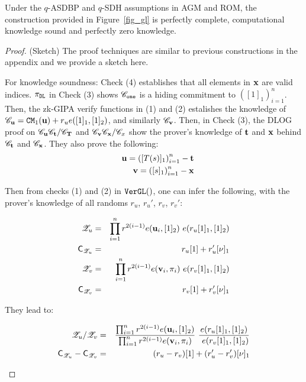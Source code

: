 \begin{lemma}\label{lemma_gl} Under the $q$-ASDBP and 
$q$-SDH assumptions \cite{Bunz21} in AGM and ROM, the construction provided in 
Figure\ \ref{fig_gl} is perfectly complete, computational knowledge
sound and perfectly zero knowledge.
\end{lemma}

\begin{proof} (Sketch) The proof techniques are similar to previous
constructions in the appendix and we provide a sketch here. 

For knowledge soundness: Check (4) establishes that all elements in
${{\mathbf {x}}}$ are valid indices. $\pi_{{\tt DL}}$ in Check (3) shows 
${\mathscr{C}}_{{\tt one}}$ is a hiding commitment to $([1]_1)_{i=1}^n$. 
Then, the zk-GIPA verify functions
in (1) and (2) estalishes the knowledge of 
${\mathscr{C}}_{{{\mathbf {u}}}} = {\mathtt{CM}}_1({{\mathbf {u}}}) + r_u e([1]_1, [1]_2)$,
and similarly ${\mathscr{C}}_{{{\mathbf {v}}}}$. Then, in Check (3),
the DLOG proof on 
${\mathscr{C}}_{{{\mathbf {u}}}}{\mathscr{C}}_{{{\mathbf {t}}}}/{\mathscr{C}}_{{{\mathbf {T}}}}$
and
${\mathscr{C}}_{{{\mathbf {v}}}}{\mathscr{C}}_{{{\mathbf {x}}}}/{\mathscr{C}}_{x}$
show the prover's knowledge of ${{\mathbf {t}}}$ and ${{\mathbf {x}}}$
behind ${\mathscr{C}}_{{{\mathbf {t}}}}$ and ${\mathscr{C}}_{{{\mathbf {x}}}}$. 
They also prove the following:
\begin{eqnarray}
& & {{\mathbf {u}}} = \left([T(s)]_1\right)_{i=1}^n - {{\mathbf {t}}} \label{eq_uTt}\\
& & {{\mathbf {v}}} = \left([s]_1\right)_{i=1}^n - {{\mathbf {x}}} \label{eq_vsx}
\end{eqnarray}

Then from checks (1) and (2) in
${\texttt{VerGL}}()$, one can infer the following, with
the prover's knowledge of
all randoms $r_u$, $r_u'$, $r_v$, $r_v'$:

\begin{small}
\begin{eqnarray}
{\mathscr{Z}}_u &=& \prod_{i=1}^n r^{2(i-1)} e({{\mathbf {u}}}_i, [1]_2)  ~e(r_u [1]_1, [1]_2) \label{zu} \\
{\mathsf{C}}_{{\mathscr{Z}}_u} &=& r_u [1] + r_u' [\nu]_1 \label{equ} \\
{\mathscr{Z}}_v &=& \prod_{i=1}^n r^{2(i-1)} e({{\mathbf {v}}}_i, \pi_i) 
	~e(r_v [1]_1, [1]_2) \label{rv} \\
{\mathsf{C}}_{{\mathscr{Z}}_v} &=& r_v [1] + r_v' [\nu]_1 \label{eqv}
\end{eqnarray}
\end{small}

They lead to:
\begin{small}
\begin{eqnarray}
{\mathscr{Z}}_u/{\mathscr{Z}}_v &=& \frac{
\prod_{i=1}^n r^{2(i-1)} e({{\mathbf {u}}}_i, [1]_2) }
{\prod_{i=1}^n r^{2(i-1)} e({{\mathbf {v}}}_i, \pi_i) }
~
\frac{e(r_u [1]_1, [1]_2) } {~e(r_v [1]_1, [1]_2) } \label{eq_dv1} \\
{\mathsf{C}}_{{\mathscr{Z}}_u} - {\mathsf{C}}_{{\mathscr{Z}}_v} & = &
	(r_u - r_v) [1] + (r_u'-r_v')[\nu]_1 \label{eq_dv2}
\end{eqnarray}
\end{small}


\end{proof}
